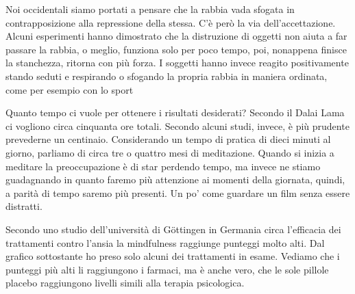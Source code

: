 \documentclass[12pt]{book} %
\begin{document}
Noi occidentali siamo portati a pensare che la rabbia vada sfogata in contrapposizione alla repressione della stessa.
C'è però la via dell'accettazione. Alcuni esperimenti hanno dimostrato che la
distruzione di oggetti non aiuta a far passare la rabbia, o meglio, funziona solo per poco tempo, poi, nonappena finisce la stanchezza, ritorna con più forza. I soggetti hanno invece reagito positivamente stando seduti e respirando o sfogando la propria rabbia in maniera
ordinata, come per esempio con lo sport

Quanto tempo ci vuole per ottenere i risultati desiderati? Secondo il Dalai Lama ci vogliono circa
cinquanta ore totali. Secondo alcuni studi, invece, è più prudente prevederne un centinaio. Considerando un
tempo di pratica di dieci minuti al giorno, parliamo di circa tre o quattro mesi di meditazione.
Quando si inizia a meditare la preoccupazione è di star perdendo tempo, ma invece ne stiamo guadagnando in quanto faremo più attenzione ai momenti della giornata, quindi, a parità di tempo saremo più presenti. Un po' come guardare un film senza essere distratti.

Secondo uno studio dell'università di Göttingen in Germania circa l'efficacia
dei trattamenti contro
l'ansia la mindfulness raggiunge punteggi molto alti. Dal grafico sottostante ho preso solo alcuni dei trattamenti in esame.
Vediamo che i punteggi più alti li raggiungono i farmaci, ma è anche vero, che le sole pillole placebo raggiungono
livelli simili alla terapia psicologica.

\needspace{4cm}
\begin{figure}[H]
  \centering
\end{figure}
\end{document}
